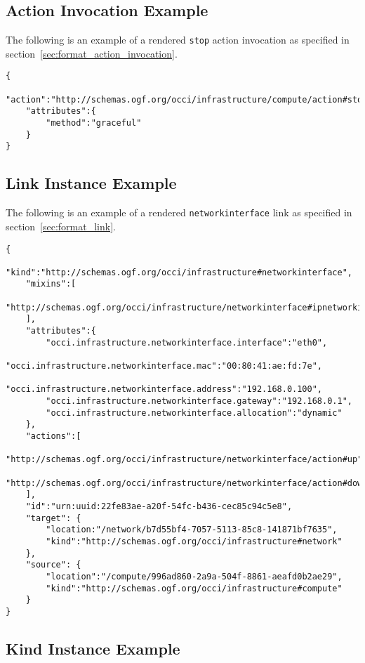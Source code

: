 \documentclass[10pt,a4paper]{article}
\begin{document}
\begin{appendices}
\subsection{Action Invocation Example}
\label{action_invocation_rendering_example}

The following is an example of a rendered \texttt{stop} action invocation as specified in section~\ref{sec:format_action_invocation}.

\begin{lstlisting}
{
    "action":"http://schemas.ogf.org/occi/infrastructure/compute/action#stop",
    "attributes":{
        "method":"graceful"
    }
}
\end{lstlisting}

\subsection{Link Instance Example}
\label{link_instance_rendering_example}

The following is an example of a rendered \texttt{networkinterface} link as specified in section~\ref{sec:format_link}.


\begin{lstlisting}
{
    "kind":"http://schemas.ogf.org/occi/infrastructure#networkinterface",
    "mixins":[
        "http://schemas.ogf.org/occi/infrastructure/networkinterface#ipnetworkinterface"
    ],
    "attributes":{
        "occi.infrastructure.networkinterface.interface":"eth0",
        "occi.infrastructure.networkinterface.mac":"00:80:41:ae:fd:7e",
        "occi.infrastructure.networkinterface.address":"192.168.0.100",
        "occi.infrastructure.networkinterface.gateway":"192.168.0.1",
        "occi.infrastructure.networkinterface.allocation":"dynamic"
    },
    "actions":[
        "http://schemas.ogf.org/occi/infrastructure/networkinterface/action#up",
        "http://schemas.ogf.org/occi/infrastructure/networkinterface/action#down"
    ],
    "id":"urn:uuid:22fe83ae-a20f-54fc-b436-cec85c94c5e8",
    "target": {
        "location:"/network/b7d55bf4-7057-5113-85c8-141871bf7635",
        "kind":"http://schemas.ogf.org/occi/infrastructure#network"
    },
    "source": {
        "location":"/compute/996ad860-2a9a-504f-8861-aeafd0b2ae29",
        "kind":"http://schemas.ogf.org/occi/infrastructure#compute"
    }
}
\end{lstlisting}

\subsection{Kind Instance Example}
\label{kind_instance_rendering_example}


\end{appendices}
\end{document}
